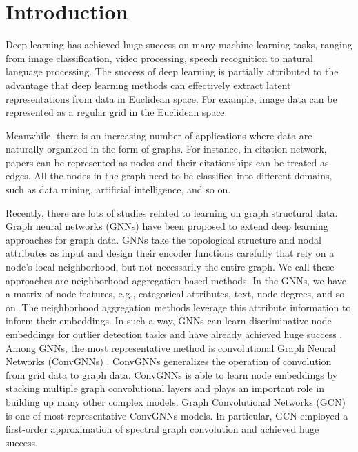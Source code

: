 

\section{Introduction}
\label{sec-intro}

Deep learning has achieved huge success on many machine learning tasks, ranging from image classification, video processing, speech recognition to natural language processing. The success of deep learning is partially attributed to the advantage that deep learning methods can effectively extract latent representations from data in Euclidean space. For example, image data can be represented as a regular grid in the Euclidean space.

Meanwhile, there is an increasing number of applications where data are naturally organized in the form of graphs. For instance, in citation network, papers can be represented as nodes and their citationships can be treated as edges. All the nodes in the graph need to be classified into different domains, such as data mining, artificial intelligence, and so on. 

Recently, there are lots of studies related to learning on graph structural data. Graph neural networks (GNNs) \cite{gori2005new} have been proposed to extend deep learning approaches for graph data. GNNs take the topological structure and nodal attributes as input and design their encoder functions carefully that rely on a node's local 
neighborhood, but not necessarily the entire graph. We call these approaches are neighborhood aggregation based methods. In the GNNs, we have a matrix of node features, e.g., categorical attributes, text, node degrees, and so on. The neighborhood aggregation methods leverage this attribute information to inform their embeddings. In such a way, GNNs can learn discriminative node embeddings for outlier detection tasks and have already achieved huge success \cite{ding2019deep,zhong2019graph}. Among GNNs, the most representative method is convolutional Graph Neural Networks (ConvGNNs) \cite{wu2019comprehensive}. ConvGNNs generalizes the operation of convolution from grid data to graph data. ConvGNNs is able to learn node embeddings by stacking multiple graph convolutional layers and plays an important role in building up many other complex models. Graph Convolutional Networks (GCN) \cite{kipf2016semi} is one of most representative ConvGNNs models. In particular, GCN employed a first-order approximation of spectral graph convolution and achieved huge success. 

